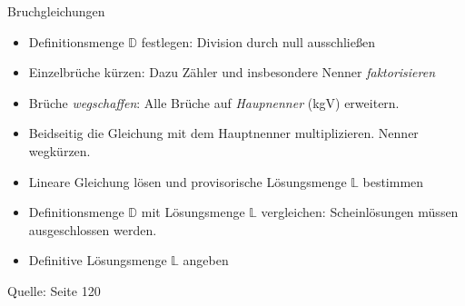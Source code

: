 \begin{rezept}{Bruchgleichungen}{}
  \begin{itemize}
    \item Definitionsmenge $\mathbb{D}$ festlegen: Division durch null ausschließen
  \item Einzelbrüche kürzen: Dazu Zähler und insbesondere Nenner \textit{faktorisieren}
  \item Brüche \textit{wegschaffen}: Alle Brüche auf
    \textit{Haupnenner} (kgV) erweitern.
  \item Beidseitig die Gleichung mit dem Hauptnenner
    multiplizieren. Nenner wegkürzen.
  \item Lineare Gleichung lösen und provisorische Lösungsmenge $\mathbb{L}$
    bestimmen
  \item Definitionsmenge $\mathbb{D}$ mit Lösungsmenge $\mathbb{L}$
    vergleichen: Scheinlösungen müssen ausgeschlossen werden.
  \item Definitive Lösungsmenge $\mathbb{L}$ angeben
    \end{itemize}
  Quelle: \cite{marthaler17} Seite 120
\end{rezept}

\newpage
